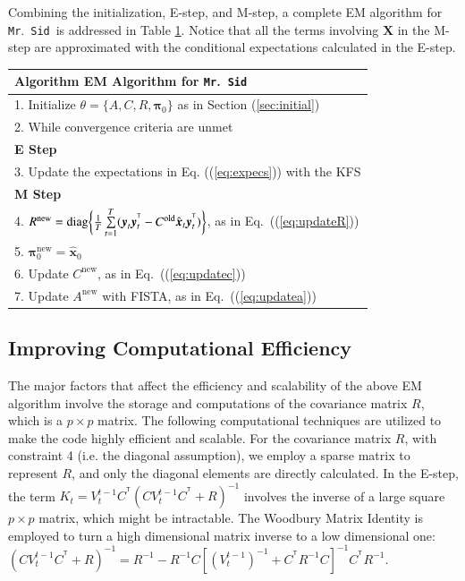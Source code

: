 \documentclass[times,twocolumn,final,authoryear]{elsarticle}
\newcommand{\mrsid}{{\sc \texttt{Mr}.~\texttt{Sid}}}
\providecommand{\mb}[1]{\boldsymbol{#1}}
\newcommand{\bx}{\mb{x}}
\newcommand{\by}{\mb{y}}
\newcommand{\bX}{\mb{X}}
\newcommand{\T}{^{\ensuremath{\mathsf{T}}}}           %
\newcommand{\diag}{\operatornamewithlimits{diag}}
\let\oldref\ref
\renewcommand{\ref}[1]{(\oldref{#1})}
\begin{document}
Combining the initialization, E-step, and M-step, a complete EM algorithm for \mrsid~is addressed in Table \oldref{tab:em}. Notice that all the terms involving $\bX$ in the M-step are approximated with the conditional expectations calculated in the E-step.\\
\begin{table}
\label{tab:em}
\begin{tabular}{l}
\hline
\textbf{Algorithm } EM Algorithm for \mrsid\\
\hline
1. Initialize $\theta =\{A,C,R,\mathbf{\pi}_0\}$ as in Section \oldref{sec:initial}\\

2. While convergence criteria are unmet \\

\textbf{E Step}\\
3. Update the expectations in Eq. \ref{eq:expecs} with the KFS\\

\textbf{M Step}\\

4. $R^{\text{new}}=\diag\biggl\{\frac{1}{T}\sum\limits_{t=1}^{T}(\by_t\by_t^{\T}-C^{\text{old}} \hat{\bx}_t\by_t^{\T})\biggr\}$, as in Eq.~\ref{eq:updateR}\\
5. $\mathbf{\pi}_0^{\text{new}}=\hat{\bx}_0$\\
6. Update $C^{\text{new}}$, as in Eq.~\ref{eq:updatec}\\
7. Update $A^{\text{new}}$ with FISTA, as in Eq.~\ref{eq:updatea}\\
\hline
\end{tabular}
\end{table}
\subsection{Improving Computational Efficiency}
The major factors that affect the efficiency and scalability of the above EM algorithm involve the storage and computations of the covariance matrix $R$, which is a ${p \times p}$ matrix. The following computational techniques are utilized to make the code highly efficient and scalable.
For the covariance matrix $R$, with constraint 4 (i.e. the diagonal assumption), we employ a sparse matrix to represent $R$, and only the diagonal elements are directly calculated.
In the E-step, the term $K_t=V_t^{t-1}C^{\T}(CV_t^{t-1}C^{\T}+R)^{-1}$ involves the inverse of a large square $p \times p$ matrix, which might be intractable. The Woodbury Matrix Identity is employed to turn a high dimensional matrix inverse to a low dimensional one: $(CV_t^{t-1}C^{\T}+R)^{-1} = R^{-1} - R^{-1}C[(V_t^{t-1})^{-1} + C^{\T}R^{-1}C]^{-1}C^{\T}R^{-1}$.
\end{document}

